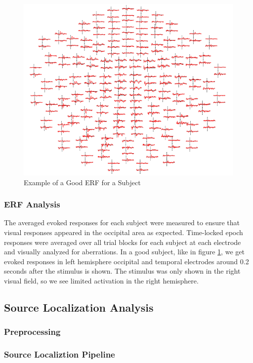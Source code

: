\documentclass[../main.tex]{subfiles}
\begin{document}
\begin{figure}
    \centering
    \includegraphics[scale=0.8]{figures/methods/good_topomap.PNG}
    \caption{Example of a Good ERF for a Subject}
    \label{good_topomap}
\end{figure}

\subsubsection{ERF Analysis}
The averaged evoked responses for each subject were measured to ensure that visual responses
appeared in the occipital area as expected. Time-locked epoch responses were averaged over all
trial blocks for each subject at each electrode and visually analyzed for aberrations. In a good subject, like in figure \ref{good_topomap}, we get evoked responses in left hemisphere occipital and temporal electrodes around 0.2 seconds after the stimulus is shown. The stimulus was only shown in the right visual field, so we see limited activation in the right hemisphere.

\subsection{Source Localization Analysis}
\subsubsection{Preprocessing}

\subsubsection{Source Localiztion Pipeline}
\end{document}
